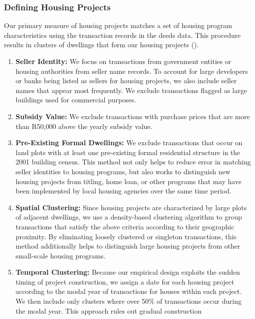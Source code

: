 \documentclass[12pt]{article}
\begin{document}
\subsubsection{Defining Housing Projects}

Our primary measure of housing projects matches a set of housing program characteristics using the transaction records in the deeds data.  This procedure results in clusters of dwellings that form our housing projects (\cite{serihistory}).

\begin{enumerate}
	\item \textbf{Seller Identity:}  We focus on transactions from government entities or housing authorities from seller name records.  To account for large developers or banks being listed as sellers for housing projects, we also include seller names that appear most frequently.  We exclude transactions flagged as large buildings used for commercial purposes.
	\item \textbf{Subsidy Value:}  We exclude transactions with purchase prices that are more than R50,000 above the yearly subsidy value.
	\item \textbf{Pre-Existing Formal Dwellings:}  We exclude transactions that occur on land plots with at least one pre-existing formal residential structure in the 2001 building census.  This method not only helps to reduce error in matching seller identities to housing programs, but also works to distinguish new housing projects from titling, home loan, or other programs that may have been implemented by local housing agencies over the same time period.
	\item \textbf{Spatial Clustering:}  Since housing projects are characterized by large plots of adjacent dwellings, we use a density-based clustering algorithm to group transactions that satisfy the above criteria according to their geographic proximity.  By eliminating loosely clustered or singleton transactions, this method additionally helps to distinguish large housing projects from other small-scale housing programs.
	\item \textbf{Temporal Clustering:}  Because our empirical design exploits the sudden timing of project construction, we assign a date for each housing project according to the modal year of transactions for houses within each project.  We then include only clusters where over 50\% of transactions occur during the modal year.  This approach rules out gradual construction 
\end{enumerate}
\end{document}
